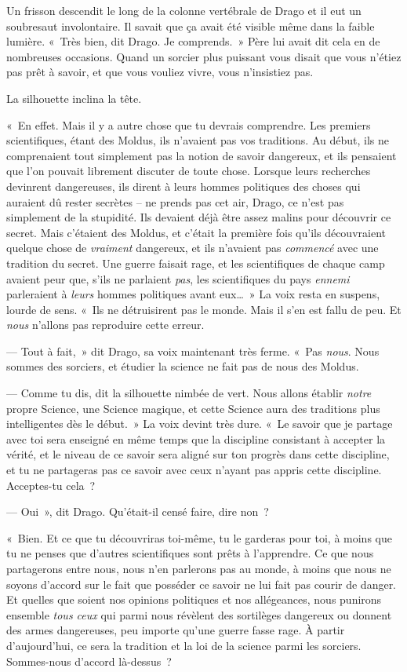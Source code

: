 Un frisson descendit le long de la colonne vertébrale de Drago et il eut un soubresaut involontaire.
Il savait que ça avait été visible même dans la faible lumière.
«~Très bien, dit Drago.
Je comprends.~»
Père lui avait dit cela en de nombreuses occasions.
Quand un sorcier plus puissant vous disait que vous n'étiez pas prêt à savoir, et que vous vouliez vivre, vous n'insistiez pas.

La silhouette inclina la tête.

«~En effet.
Mais il y a autre chose que tu devrais comprendre.
Les premiers scientifiques, étant des Moldus, ils n'avaient pas vos traditions.
Au début, ils ne comprenaient tout simplement pas la notion de savoir dangereux, et ils pensaient que l'on pouvait librement discuter de toute chose.
Lorsque leurs recherches devinrent dangereuses, ils dirent à leurs hommes politiques des choses qui auraient dû rester secrètes -- ne prends pas cet air, Drago, ce n'est pas simplement de la stupidité.
Ils devaient déjà être assez malins pour découvrir ce secret.
Mais c'étaient des Moldus, et c'était la première fois qu'ils découvraient quelque chose de \emph{vraiment} dangereux, et ils n'avaient pas \emph{commencé} avec une tradition du secret.
Une guerre faisait rage, et les scientifiques de chaque camp avaient peur que, s'ils ne parlaient \emph{pas}, les scientifiques du pays \emph{ennemi} parleraient à \emph{leurs} hommes politiques avant eux…~»
La voix resta en suspens, lourde de sens.
«~Ils ne détruisirent pas le monde.
Mais il s'en est fallu de peu.
Et \emph{nous} n'allons pas reproduire cette erreur.

--- Tout à fait,~» dit Drago, sa voix maintenant très ferme.
«~Pas \emph{nous}.
Nous sommes des sorciers, et étudier la science ne fait pas de nous des Moldus.

--- Comme tu dis, dit la silhouette nimbée de vert.
Nous allons établir \emph{notre} propre Science, une Science magique, et cette Science aura des traditions plus intelligentes dès le début.~»
La voix devint très dure.
«~Le savoir que je partage avec toi sera enseigné en même temps que la discipline consistant à accepter la vérité, et le niveau de ce savoir sera aligné sur ton progrès dans cette discipline, et tu ne partageras pas ce savoir avec ceux n'ayant pas appris cette discipline.
Acceptes-tu cela~?

--- Oui~», dit Drago.
Qu'était-il censé faire, dire non~?

«~Bien. Et ce que tu découvriras toi-même, tu le garderas pour toi, à moins que tu ne penses que d'autres scientifiques sont prêts à l'apprendre.
Ce que nous partagerons entre nous, nous n'en parlerons pas au monde, à moins que nous ne soyons d'accord sur le fait que posséder ce savoir ne lui fait pas courir de danger.
Et quelles que soient nos opinions politiques et nos allégeances, nous punirons ensemble \emph{tous ceux} qui parmi nous révèlent des sortilèges dangereux ou donnent des armes dangereuses, peu importe qu'une guerre fasse rage.
À partir d'aujourd'hui, ce sera la tradition et la loi de la science parmi les sorciers.
Sommes-nous d'accord là-dessus~?


